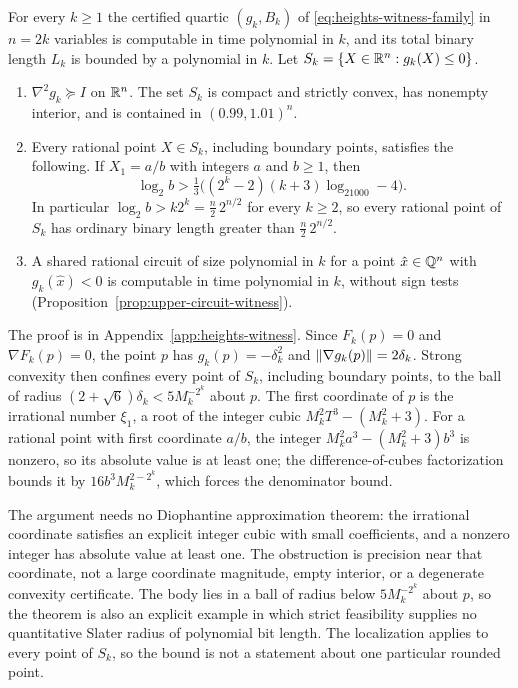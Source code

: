 \begin{theorem}
\label{thm:heights-witness}
For every $k\ge1$ the certified quartic $(g_k,B_k)$ of
\eqref{eq:heights-witness-family} in $n=2k$ variables is computable in time
polynomial in $k$, and its total binary length $L_k$ is bounded by a
polynomial in $k$. Let $S_k=\{X\in\mathbb R^n:g_k(X)\le0\}$.
\begin{enumerate}[label=(\alph*)]
\item $\nabla^2g_k\succeq I$ on $\mathbb R^n$. The set $S_k$ is compact and strictly
  convex, has nonempty interior, and is contained in $(0.99,1.01)^n$.
\item Every rational point $X\in S_k$, including boundary points, satisfies
  the following. If $X_1=a/b$ with integers $a$ and $b\ge1$, then
  \[
   \log_2b>\tfrac13\bigl((2^k-2)(k+3)\log_21000-4\bigr).
  \]
  In particular $\log_2b>k2^k=\frac n2\,2^{n/2}$ for every $k\ge2$, so
  every rational point of $S_k$ has ordinary binary length greater than
  $\frac n2\,2^{n/2}$.
\item A shared rational circuit of size polynomial in $k$ for a point
  $\hat x\in\mathbb Q^n$ with $g_k(\hat x)<0$ is computable in time polynomial in
  $k$, without sign tests (Proposition~\ref{prop:upper-circuit-witness}).
\end{enumerate}
\end{theorem}

The proof is in Appendix~\ref{app:heights-witness}. Since $F_k(p)=0$ and
$\nabla F_k(p)=0$, the point $p$ has $g_k(p)=-\delta_k^2$ and
$\left\lVert\nabla g_k(p)\right\rVert=2\delta_k$. Strong convexity then confines every point
of $S_k$, including boundary points, to the ball of radius
$(2+\sqrt6)\delta_k<5M_k^{-2^k}$ about $p$. The first coordinate of $p$ is the
irrational number $\xi_1$, a root of the integer cubic
$M_k^2T^3-(M_k^2+3)$. For a rational point with first coordinate $a/b$, the
integer $M_k^2a^3-(M_k^2+3)b^3$ is nonzero, so its absolute value is at least
one; the difference-of-cubes factorization bounds it by
$16b^3M_k^{2-2^k}$, which forces the denominator bound.

The argument needs no Diophantine approximation theorem: the irrational
coordinate satisfies an explicit integer cubic with small coefficients, and a
nonzero integer has absolute value at least one. The obstruction is precision
near that coordinate, not a large coordinate magnitude, empty interior, or a
degenerate convexity certificate. The body lies in a ball of radius below
$5M_k^{-2^k}$ about $p$, so the theorem is also an explicit example in which
strict feasibility supplies no quantitative Slater radius of polynomial bit
length. The localization applies to every point of $S_k$, so the bound is not
a statement about one particular rounded point.

